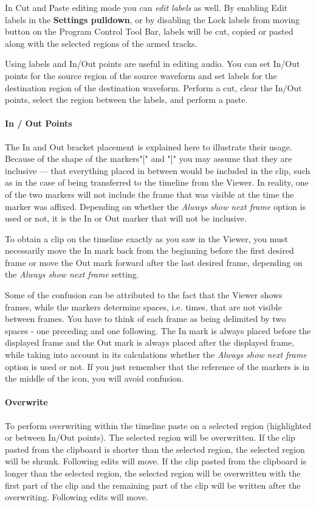 In Cut and Paste editing mode you can \textit{edit labels} as well. By enabling Edit labels in the \textbf{Settings pulldown}, or by disabling the Lock labels from moving button on the Program Control Tool Bar, labels will be cut, copied or pasted along with the selected regions of the armed tracks.

Using labels and In/Out points are useful in editing audio.  You can set In/Out points for the source region of the source waveform and set labels for the destination region of the destination waveform. Perform a cut, clear the In/Out points, select the region between the labels, and perform a paste.

\paragraph{In / Out Points} The In and Out bracket placement is explained here to illustrate their usage.  Because of the shape of the markers"[" and "]" you may assume that they are inclusive --- that everything placed in between would be included in the clip, such as in the case of being transferred to the timeline from the Viewer.  In reality, one of the two markers will not include the frame that was visible at the time the marker was affixed. Depending on whether the \textit{Always show next frame} option is used or not, it is the In or Out marker that will not be inclusive. 

To obtain a clip on the timeline exactly as you saw in the Viewer, you must necessarily move the In mark back from the beginning before the first desired frame or move the Out mark forward after the last desired frame, depending on the \textit{Always show next frame} setting. 

Some of the confusion can be attributed to the fact that the Viewer shows frames, while the markers determine spaces, i.e. times, that are not visible between frames. You have to think of each frame as being delimited by two spaces - one preceding and one following.  The In mark is always placed before the displayed frame and the Out mark is always placed after the displayed frame, while taking into account in its calculations whether the \textit{Always show next frame }option is used or not. If you just remember that the reference of the markers is in the middle of the icon, you will avoid confusion.

\paragraph{Overwrite} To perform overwriting within the timeline paste on a selected region (highlighted or
between In/Out points). The selected region will be overwritten. If the clip pasted from the clipboard
is shorter than the selected region, the selected region will be shrunk. Following edits will move. If 
the clip pasted from the clipboard is longer than the selected region, the selected region will be
overwritten with the first part of the clip and the remaining part of the clip will be written after the
overwriting. Following edits will move.

